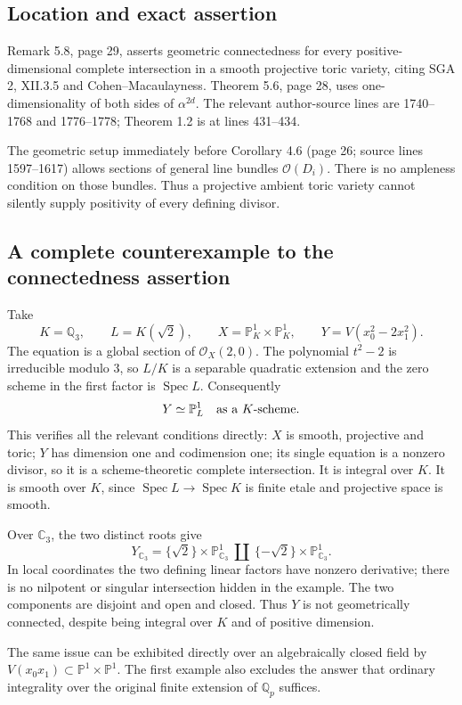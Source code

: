 \documentclass[10pt]{article}
\begin{document}
\subsection*{Location and exact assertion}
Remark 5.8, page 29, asserts geometric connectedness for every positive-dimensional complete intersection in a smooth projective toric variety, citing SGA 2, XII.3.5 and Cohen–Macaulayness. Theorem 5.6, page 28, uses one-dimensionality of both sides of \(\alpha^{2d}\). The relevant author-source lines are 1740–1768 and 1776–1778; Theorem 1.2 is at lines 431–434.\par
The geometric setup immediately before Corollary 4.6 (page 26; source lines 1597–1617) allows sections of general line bundles \(\mathcal O(D_i)\). There is no ampleness condition on those bundles. Thus a projective ambient toric variety cannot silently supply positivity of every defining divisor.\par
\subsection*{A complete counterexample to the connectedness assertion}
Take \[K=\mathbb Q_3,\qquad L=K(\sqrt2),\qquad
 X=\mathbb P^1_K\times\mathbb P^1_K,\qquad
 Y=V(x_0^2-2x_1^2).\] The equation is a global section of \(\mathcal O_X(2,0)\). The polynomial \(t^2-2\) is irreducible modulo \(3\), so \(L/K\) is a separable quadratic extension and the zero scheme in the first factor is \(\operatorname{Spec}L\). Consequently \[Y\simeq\mathbb P^1_L
 \quad\hbox{as a $K$-scheme}.\] This verifies all the relevant conditions directly: \(X\) is smooth, projective and toric; \(Y\) has dimension one and codimension one; its single equation is a nonzero divisor, so it is a scheme-theoretic complete intersection. It is integral over \(K\). It is smooth over \(K\), since \(\operatorname{Spec}L\to
\operatorname{Spec}K\) is finite etale and projective space is smooth.\par
Over \(\mathbb C_3\), the two distinct roots give \[Y_{\mathbb C_3}
   =\{\sqrt2\}\times\mathbb P^1_{\mathbb C_3}
     \ \amalg\
     \{-\sqrt2\}\times\mathbb P^1_{\mathbb C_3}.\] In local coordinates the two defining linear factors have nonzero derivative; there is no nilpotent or singular intersection hidden in the example. The two components are disjoint and open and closed. Thus \(Y\) is not geometrically connected, despite being integral over \(K\) and of positive dimension.\par
The same issue can be exhibited directly over an algebraically closed field by \(V(x_0x_1)\subset\mathbb P^1\times\mathbb P^1\). The first example also excludes the answer that ordinary integrality over the original finite extension of \(\mathbb Q_p\) suffices.\par
\end{document}
